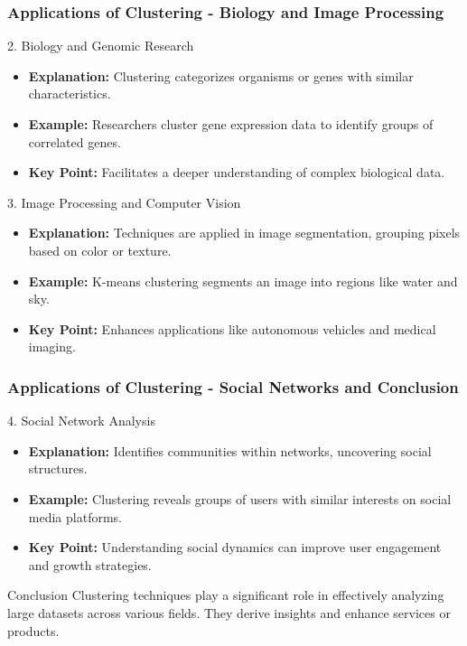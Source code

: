 \documentclass[aspectratio=169]{beamer}
\begin{document}
\begin{frame}[fragile]
    \frametitle{Applications of Clustering - Biology and Image Processing}
    \begin{block}{2. Biology and Genomic Research}
        \begin{itemize}
            \item \textbf{Explanation:} Clustering categorizes organisms or genes with similar characteristics.
            \item \textbf{Example:} Researchers cluster gene expression data to identify groups of correlated genes.
            \item \textbf{Key Point:} Facilitates a deeper understanding of complex biological data.
        \end{itemize}
    \end{block}
    
    \begin{block}{3. Image Processing and Computer Vision}
        \begin{itemize}
            \item \textbf{Explanation:} Techniques are applied in image segmentation, grouping pixels based on color or texture.
            \item \textbf{Example:} K-means clustering segments an image into regions like water and sky.
            \item \textbf{Key Point:} Enhances applications like autonomous vehicles and medical imaging.
        \end{itemize}
    \end{block}
\end{frame}

\begin{frame}[fragile]
    \frametitle{Applications of Clustering - Social Networks and Conclusion}
    \begin{block}{4. Social Network Analysis}
        \begin{itemize}
            \item \textbf{Explanation:} Identifies communities within networks, uncovering social structures.
            \item \textbf{Example:} Clustering reveals groups of users with similar interests on social media platforms.
            \item \textbf{Key Point:} Understanding social dynamics can improve user engagement and growth strategies.
        \end{itemize}
    \end{block}
    
    \begin{block}{Conclusion}
        Clustering techniques play a significant role in effectively analyzing large datasets across various fields. They derive insights and enhance services or products.
    \end{block}
\end{frame}
\end{document}

